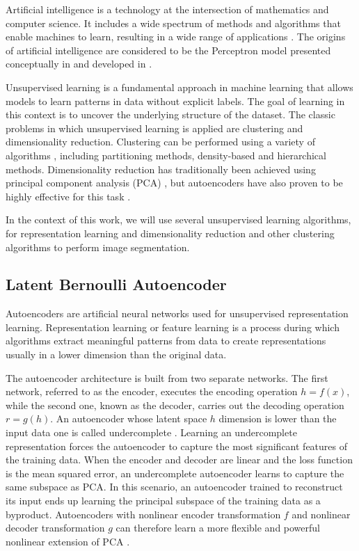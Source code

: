 \documentclass[a4paper,12pt]{article}
\begin{document}
Artificial intelligence is a technology at the intersection of mathematics and computer science. It includes a wide spectrum of methods and algorithms that enable machines to learn, resulting in a wide range of applications \cite{raschka2019, Goodfellow2016}. The origins of artificial intelligence are considered to be the Perceptron model presented conceptually in \cite{Mcculloch1943} and developed in \cite{Rosenblatt1958}. 

Unsupervised learning is a fundamental approach in machine learning that allows models to learn patterns in data without explicit labels. The goal of learning in this context is to uncover the underlying structure of the dataset. The classic problems in which unsupervised learning is applied are clustering and dimensionality reduction. Clustering can be performed using a variety of algorithms \cite{Bindra2017}, including partitioning methods, density-based and hierarchical methods. Dimensionality reduction has traditionally been achieved using principal component analysis (PCA) \cite{Goodfellow2016}, but autoencoders have also proven to be highly effective for this task \cite{Wang2014}. 

In the context of this work, we will use several unsupervised learning algorithms, for representation learning and dimensionality reduction and other clustering algorithms to perform image segmentation.

\subsection{Latent Bernoulli Autoencoder}\label{lbae_section}

Autoencoders are artificial neural networks used for unsupervised representation learning. Representation learning or feature learning is a process during which algorithms extract meaningful patterns from data to create representations usually in a lower dimension than the original data.

The autoencoder architecture is built from two separate networks. The first network, referred to as the encoder, executes the encoding operation $h = f(x)$, while the second one, known as the decoder, carries out the decoding operation $r = g(h)$. An autoencoder whose latent space  $h$ dimension is lower than the input data one is called undercomplete \cite{Goodfellow2016}. Learning an undercomplete representation forces the autoencoder to capture the most significant features of the training data.
When the encoder and decoder are linear and the loss function is the mean squared error, an undercomplete autoencoder learns to capture the same subspace as PCA. In this scenario, an autoencoder trained to reconstruct its input ends up learning the principal subspace of the training data as a byproduct. Autoencoders with nonlinear encoder transformation $f$ and nonlinear decoder transformation $g$ can therefore learn a more flexible and powerful nonlinear extension of PCA \cite{Goodfellow2016}. 
\end{document}
